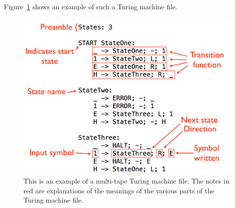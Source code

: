 \documentclass[11pt]{article}
\begin{document}
Figure~\ref{fig:tmexample} shows an example of such a Turing machine file.

\begin{figure} 
\begin{center} 
\includegraphics[scale=0.4]{figs/annotatedtm.png} 
\caption{This is an example of a multi-tape Turing machine file. The notes in red are explanations of the meanings of the various parts of the Turing machine file. \label{fig:tmexample}} 
\end{center} 
\end{figure}
\end{document}
